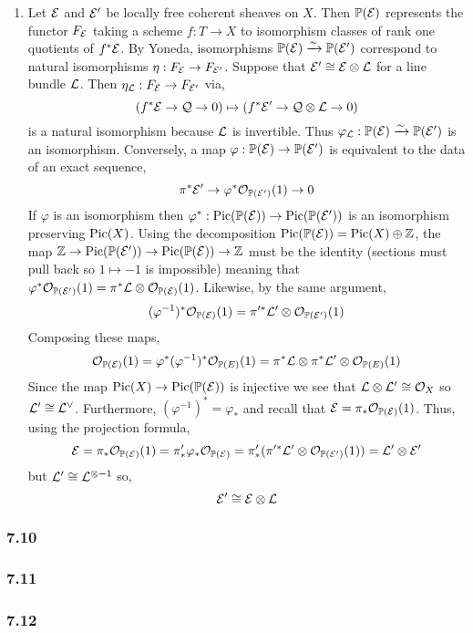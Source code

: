 \documentclass[12pt]{article}
\begin{document}
\begin{enumerate}
\item Let $\mathcal{E}$ and $\mathcal{E}'$ be locally free coherent sheaves on $X$. Then $\mathbb{P}(\mathcal{E})$ represents the functor $F_{\mathcal{E}}$ taking a scheme $f : T \to X$ to isomorphism classes of rank one quotients of $f^* \mathcal{E}$. By Yoneda, isomorphisms $\mathbb{P}(\mathcal{E}) \xrightarrow{\sim} \mathbb{P}(\mathcal{E}')$ correspond to natural isomorphisms $\eta : F_{\mathcal{E}} \to F_{\mathcal{E}'}$. Suppose that $\mathcal{E}' \cong \mathcal{E} \otimes \mathcal{L}$ for a line bundle $\mathcal{L}$. Then $\eta_{\mathcal{L}} : F_{\mathcal{E}} \to F_{\mathcal{E}'}$ via,
\[ (f^* \mathcal{E} \to \mathcal{Q} \to 0) \mapsto (f^* \mathcal{E}' \to \mathcal{Q} \otimes \mathcal{L} \to 0) \] 
is a natural isomorphism because $\mathcal{L}$ is invertible. Thus $\varphi_{\mathcal{L}} : \mathbb{P}(\mathcal{E}) \xrightarrow{\sim} \mathbb{P}(\mathcal{E}')$ is an isomorphism. Conversely, a map $\varphi : \mathbb{P}(\mathcal{E}) \to \mathbb{P}(\mathcal{E}')$ is equivalent to the data of an exact sequence,
\[ \pi^* \mathcal{E}' \to \varphi^*\mathcal{O}_{\mathbb{P}(\mathcal{E}')}(1) \to 0 \]
If $\varphi$ is an isomorphism then $\varphi^* : \mathrm{Pic}(\mathbb{P}(\mathcal{E})) \to \mathrm{Pic}(\mathbb{P}(\mathcal{E}'))$ is an isomorphism preserving $\mathrm{Pic}(X)$. Using the decomposition $\mathrm{Pic}(\mathbb{P}(\mathcal{E})) = \mathrm{Pic}(X) \oplus \mathbb{Z}$, the map $\mathbb{Z} \to \mathrm{Pic}(\mathbb{P}(\mathcal{E}')) \to \mathrm{Pic}(\mathbb{P}(\mathcal{E})) \to \mathbb{Z}$ must be the identity (sections must pull back so $1 \mapsto -1$ is impossible) meaning that $\varphi^* \mathcal{O}_{\mathbb{P}(\mathcal{E}')}(1) = \pi^* \mathcal{L} \otimes \mathcal{O}_{\mathbb{P}(\mathcal{E})}(1)$. Likewise, by the same argument,
\[ (\varphi^{-1})^* \mathcal{O}_{\mathbb{P}(\mathcal{E})}(1) = \pi'^* \mathcal{L}' \otimes \mathcal{O}_{\mathbb{P}(\mathcal{E}')}(1) \]
Composing these maps,
\[ \mathcal{O}_{\mathbb{P}(\mathcal{E})}(1) = \varphi^* (\varphi^{-1})^* \mathcal{O}_{\mathbb{P}(E)}(1) = \pi^* \mathcal{L} \otimes \pi^* \mathcal{L}' \otimes \mathcal{O}_{\mathbb{P}(E)}(1) \]
Since the map $\mathrm{Pic}(X) \to \mathrm{Pic}(\mathbb{P}(\mathcal{E}))$ is injective we see that $\mathcal{L} \otimes \mathcal{L}' \cong \mathcal{O}_{X}$ so $\mathcal{L}' \cong \mathcal{L}^\vee$. Furthermore, $(\varphi^{-1})^* = \varphi_*$ and recall that $\mathcal{E} = \pi_* \mathcal{O}_{\mathbb{P}(\mathcal{E})}(1)$. Thus, using the projection formula,
\[ \mathcal{E} = \pi_* \mathcal{O}_{\mathbb{P}(\mathcal{E})}(1) = \pi'_* \varphi_* \mathcal{O}_{\mathbb{P}(\mathcal{E})} = \pi'_* (\pi'^* \mathcal{L}' \otimes \mathcal{O}_{\mathbb{P}(\mathcal{E}')}(1)) = \mathcal{L}' \otimes \mathcal{E}' \]
but $\mathcal{L}' \cong \mathcal{L}^{\otimes -1}$ so,
\[ \mathcal{E}' \cong \mathcal{E} \otimes \mathcal{L} \]
\end{enumerate}

\subsubsection{7.10}

\subsubsection{7.11}

\subsubsection{7.12}
\end{document}

